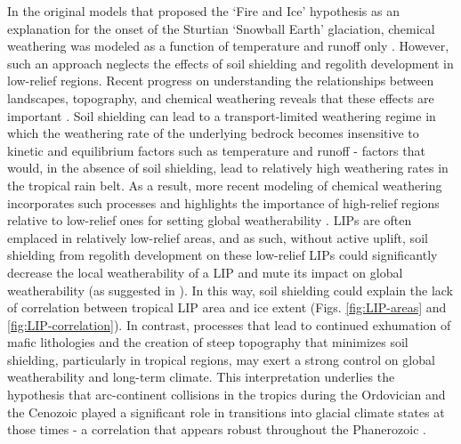 In the original models that proposed the `Fire and Ice' hypothesis as an explanation for the onset of the Sturtian `Snowball Earth' glaciation, chemical weathering was modeled as a function of temperature and runoff only \citep{Donnadieu2004a}. However, such an approach neglects the effects of soil shielding and regolith development in low-relief regions. Recent progress on understanding the relationships between landscapes, topography, and chemical weathering reveals that these effects are important \citep{Gabet2009a, Hartmann2014a, Maher2014a, Godderis2017b}. Soil shielding can lead to a transport-limited weathering regime in which the weathering rate of the underlying bedrock becomes insensitive to kinetic and equilibrium factors such as temperature and runoff - factors that would, in the absence of soil shielding, lead to relatively high weathering rates in the tropical rain belt. As a result, more recent modeling of chemical weathering incorporates such processes and highlights the importance of high-relief regions relative to low-relief ones for setting global weatherability \citep{West2012a, Godderis2017b}. LIPs are often emplaced in relatively low-relief areas, and as such, without active uplift, soil shielding from regolith development on these low-relief LIPs could significantly decrease the local weatherability of a LIP and mute its impact on global weatherability (as suggested in \citealp{Kent2013a}). In this way, soil shielding could explain the lack of correlation between tropical LIP area and ice extent (Figs. \ref{fig:LIP-areas} and \ref{fig:LIP-correlation}). In contrast, processes that lead to continued exhumation of mafic lithologies and the creation of steep topography that minimizes soil shielding, particularly in tropical regions, may exert a strong control on global weatherability and long-term climate. This interpretation underlies the hypothesis that arc-continent collisions in the tropics during the Ordovician \citep{Swanson-Hysell2017a} and the Cenozoic \citep{Jagoutz2016a} played a significant role in transitions into glacial climate states at those times - a correlation that appears robust throughout the Phanerozoic \citep{Macdonald2019a}.

